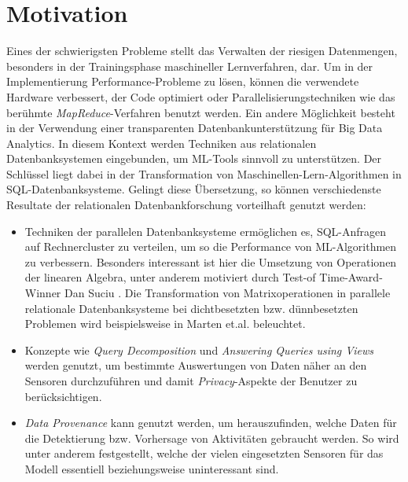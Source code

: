 \section*{Motivation}
Eines der schwierigsten Probleme stellt das Verwalten der riesigen Datenmengen, besonders in der Trainingsphase maschineller Lernverfahren, dar. Um in der Implementierung Performance-Probleme zu lösen, können die verwendete Hardware verbessert, der Code optimiert oder Parallelisierungstechniken wie das berühmte \textit{MapReduce}-Verfahren \cite{DBLP:journals/cn/BrinP98} benutzt werden. Ein andere Möglichkeit besteht in der Verwendung einer transparenten Datenbankunterstützung \cite{DBLP:conf/gvd/MartenH15} für Big Data Analytics. In diesem Kontext werden Techniken aus relationalen Datenbanksystemen eingebunden, um ML-Tools sinnvoll zu unterstützen.
Der Schlüssel liegt dabei in der Transformation von Maschinellen-Lern-Algorithmen in SQL-Datenbanksysteme. Gelingt diese Übersetzung, so können verschiedenste Resultate der relationalen Datenbankforschung vorteilhaft genutzt werden:
\begin{itemize}
    \item Techniken der parallelen Datenbanksysteme ermöglichen es, SQL-Anfragen auf Rechnercluster zu verteilen, um so die Performance von ML-Algorithmen zu verbessern. Besonders interessant ist hier die Umsetzung von Operationen der linearen Algebra, unter anderem motiviert durch Test-of Time-Award-Winner Dan Suciu \cite{interviewsuciu}. Die Transformation von Matrixoperationen in parallele relationale Datenbanksysteme bei dichtbesetzten bzw. dünnbesetzten Problemen wird beispielsweise in Marten et.al. \cite{martensparse} beleuchtet.
    \item Konzepte wie \textit{Query Decomposition} \cite{chirkova2011materialized} und \textit{Answering Queries using Views} \cite{ afrati2019answering, levy1999answering} werden genutzt, um bestimmte Auswertungen von Daten näher an den Sensoren durchzuführen und damit \textit{Privacy}-Aspekte \cite{agrawal2000privacy} der Benutzer zu berücksichtigen.
    \item \textit{Data Provenance} \cite{heuer2015metis, bruder2017konzepte} kann genutzt werden, um herauszufinden, welche Daten für die Detektierung bzw. Vorhersage von Aktivitäten gebraucht werden. 
    So wird unter anderem festgestellt, welche der vielen eingesetzten Sensoren für das Modell essentiell beziehungsweise uninteressant sind.
\end{itemize}

